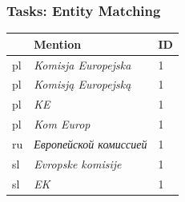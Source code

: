 \documentclass{beamer}
\newcommand\textcyr[1]{{\fontencoding{T2A}\selectfont #1}}
\newcommand{\comment}[1]{}
\begin{document}
\begin{frame}[fragile]
 \frametitle{Tasks: Entity Matching}

\begin{table}
  \begin{center}
    \begin{footnotesize}
      \begin{tabular}{lll}
        \toprule 
        \comment{Lan} & Mention & ID \\
        \midrule        
        pl & {\color{blue}\textit{Komisja Europejska}} & 1 \\
				pl & {\color{blue}\textit{Komisją Europejską}} & 1 \\
				pl & {\color{blue}\textit{KE}} & 1 \\
				pl & {\color{blue}\textit{Kom Europ}} & 1 \\
        ru & {\color{blue}\textit{\textcyr{Европейской комиссией}}} & 1 \\
        sl & {\color{blue}\textit{Evropske komisije}} & 1\\        
				sl & {\color{blue}\textit{EK}} & 1\\        
        \bottomrule
      \end{tabular}
    \end{footnotesize}
  \end{center}
\end{table}

\end{frame}
\end{document}
